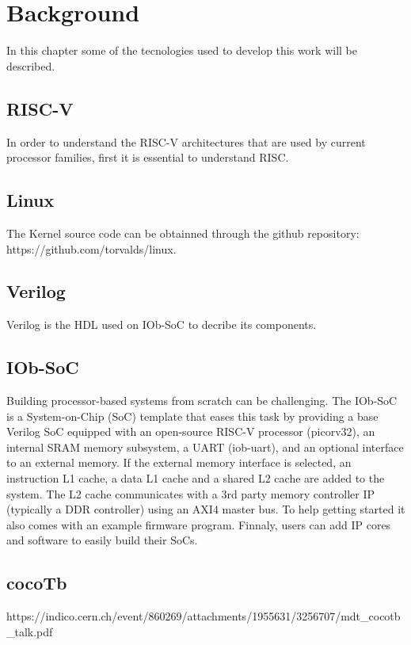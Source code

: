 \chapter{Background}
\label{chapter:background}

\quad In this chapter some of the tecnologies used to develop this work will be described.
\section{RISC-V}
\quad In order to understand the RISC-V architectures that are used by current processor families, first it is essential to understand RISC.

\section{Linux}
\quad
\quad The Kernel source code can be obtainned through the github repository: https://github.com/torvalds/linux.

\section{Verilog}
\quad Verilog is the HDL used on IOb-SoC to decribe its components.

\section{IOb-SoC}
\quad Building processor-based systems from scratch can be challenging. The IOb-SoC is a System-on-Chip (SoC) template that eases this task by providing a base Verilog SoC equipped with an open-source RISC-V processor (picorv32), an internal SRAM memory subsystem, a UART (iob-uart), and an optional interface to an external memory. If the external memory interface is selected, an instruction L1 cache, a data L1 cache and a shared L2 cache are added to the system. The L2 cache communicates with a 3rd party memory controller IP (typically a DDR controller) using an AXI4 master bus. To help getting started it also comes with an example firmware program. Finnaly, users can add IP cores and software to easily build their SoCs.

\section{cocoTb}
https://indico.cern.ch/event/860269/attachments/1955631/3256707/mdt_cocotb_talk.pdf

\newpage
